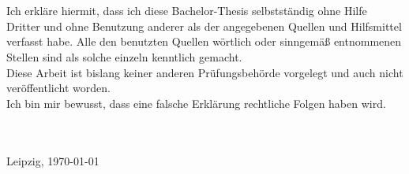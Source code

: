 \chapter*{\thesisAffidavitName}

Ich erkläre hiermit, dass ich diese Bachelor-Thesis selbstständig ohne Hilfe Dritter und ohne Benutzung anderer als der angegebenen Quellen und Hilfsmittel verfasst habe. Alle den benutzten Quellen wörtlich oder sinngemäß entnommenen Stellen sind als solche einzeln kenntlich gemacht.\\
Diese Arbeit ist bislang keiner anderen Prüfungsbehörde vorgelegt und auch nicht veröffentlicht worden.\\
Ich bin mir bewusst, dass eine falsche Erklärung rechtliche Folgen haben wird.

{
\vspace{32pt}
\noindent
\hdashrule{5cm}{1pt}{1pt 3pt}\\
\thesisAuthor{}\\Leipzig, \today
}
